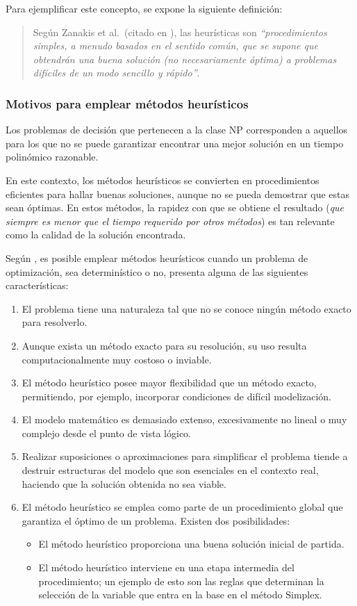 \documentclass[12pt,titlepage,twoside,openright]{book}
\begin{document}
Para ejemplificar este concepto, se expone la siguiente definición:

\begin{quote}
	Según Zanakis et al.\ (citado en \citep{duarte2007metaheuristicas}), las heurísticas son \textit{``procedimientos simples, a menudo basados en el sentido común, que se supone que obtendrán una buena solución (no necesariamente óptima) a problemas difíciles de un modo sencillo y rápido''}.
\end{quote}

\subsubsection{Motivos para emplear métodos heurísticos}

Los problemas de decisión que pertenecen a la clase NP corresponden a aquellos para los que no se puede garantizar encontrar una mejor solución en un tiempo polinómico razonable.

En este contexto, los métodos heurísticos se convierten en procedimientos eficientes para hallar buenas soluciones, aunque no se pueda demostrar que estas sean óptimas. En estos métodos, la rapidez con que se obtiene el resultado (\textit{que siempre es menor que el tiempo requerido por otros métodos}) es tan relevante como la calidad de la solución encontrada.

Según \citep{antonioSuarez2014}, es posible emplear métodos heurísticos cuando un problema de optimización, sea determinístico o no, presenta alguna de las siguientes características:


\begin{enumerate}[label=\alph*.]
	\item El problema tiene una naturaleza tal que no se conoce ningún método exacto para resolverlo.
	\item Aunque exista un método exacto para su resolución, su uso resulta computacionalmente muy costoso o inviable.
	\item El método heurístico posee mayor flexibilidad que un método exacto, permitiendo, por ejemplo, incorporar condiciones de difícil modelización.
	\item El modelo matemático es demasiado extenso, excesivamente no lineal o muy complejo desde el punto de vista lógico.
	\item Realizar suposiciones o aproximaciones para simplificar el problema tiende a destruir estructuras del modelo que son esenciales en el contexto real, haciendo que la solución obtenida no sea viable.
	\item El método heurístico se emplea como parte de un procedimiento global que garantiza el óptimo de un problema. Existen dos posibilidades:
	      \begin{itemize}
		      \item El método heurístico proporciona una buena solución inicial de partida.
		      \item El método heurístico interviene en una etapa intermedia del procedimiento; un ejemplo de esto son las reglas que determinan la selección de la variable que entra en la base en el método Simplex.
	      \end{itemize}
\end{enumerate}
\end{document}

